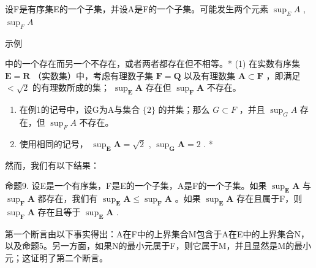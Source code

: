 设F是有序集E的一个子集，并设A是F的一个子集。可能发生两个元素 \(\sup_{E} A\) , \(\sup_{F} A\)

示例

中的一个存在而另一个不存在，或者两者都存在但不相等。* (1) 在实数有序集 \(\mathbf{E} = \mathbf{R}\) （实数集）中，考虑有理数子集 \(\mathbf{F} = \mathbf{Q}\) 以及有理数集 \(\mathbf{A} \subset \mathbf{F}\) ，即满足 \(< \sqrt{2}\) 的有理数所成的集； \(\sup_{\mathbf{E}} \mathbf{A}\) 存在但 \(\sup_{\mathbf{F}} \mathbf{A}\) 不存在。

\begin{enumerate}
\def\labelenumi{(\arabic{enumi})}
\setcounter{enumi}{1}
\item
  在例1的记号中，设G为A与集合 \(\{2\}\) 的并集；那么 \(G \subset F\) ，并且 \(\sup_{G} A\) 存在，但 \(\sup_{F} A\) 不存在。
\item
  使用相同的记号， \(\sup_{\mathbf{E}} \mathbf{A} = \sqrt{2}\) , \(\sup_{\mathbf{G}} \mathbf{A} = 2\) . *
\end{enumerate}

然而，我们有以下结果：

命题9. 设E是一个有序集，F是E的一个子集，A是F的一个子集。如果 \(\sup_{\mathbf{E}}\mathbf{A}\) 与 \(\sup_{\mathbf{F}}\mathbf{A}\) 都存在，我们有 \(\sup_{\mathbf{E}}\mathbf{A} \leqslant \sup_{\mathbf{F}}\mathbf{A}\) 。如果 \(\sup_{\mathbf{E}}\mathbf{A}\) 存在且属于F，则 \(\sup_{\mathbf{F}}\mathbf{A}\) 存在且等于 \(\sup_{\mathbf{E}}\mathbf{A}\) .

第一个断言由以下事实得出：A在F中的上界集合M包含于A在E中的上界集合N，以及命题5。另一方面，如果N的最小元属于F，则它属于M，并且显然是M的最小元；这证明了第二个断言。

